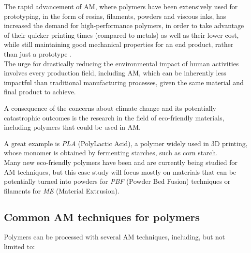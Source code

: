 \documentclass{article}
\begin{document}
    The rapid advancement of AM, where polymers have been extensively used for prototyping, in the form of resins, filaments, powders and viscous inks, 
    has increased the demand for high-performance polymers, in order to take advantage of their quicker printing times (compared to metals) as well as their lower cost, while still
    maintaining good mechanical properties for an end product, rather than just a prototype \autocite*{Recent_progress_polymers_AM}. \\ 

    The urge for drastically reducing the environmental impact of human activities involves every production field, including AM, which can be inherently less impactful
    than traditional manufacturing processes, given the same material and final product to achieve. 

    A consequence of the concerns about climate change and its potentially catastrophic outcomes is the research in the field of eco-friendly materials, including polymers 
    that could be used in AM. 
    
    A great example is \textit{PLA} (PolyLactic Acid), a polymer widely used in 3D printing, whose monomer is obtained by fermenting starches, such as corn starch. \\ 

    Many new eco-friendly polymers have been and are currently being studied for AM techniques, but this case study will focus mostly on materials that can be potentially turned 
    into powders for \textit{PBF} (Powder Bed Fusion) techniques or filaments for \textit{ME} (Material Extrusion). 
    
    \subsection{Common AM techniques for polymers\label{AM_techniques_summary}}
    
    Polymers can be processed with several AM techniques, including, but not limited to: 
\end{document}
